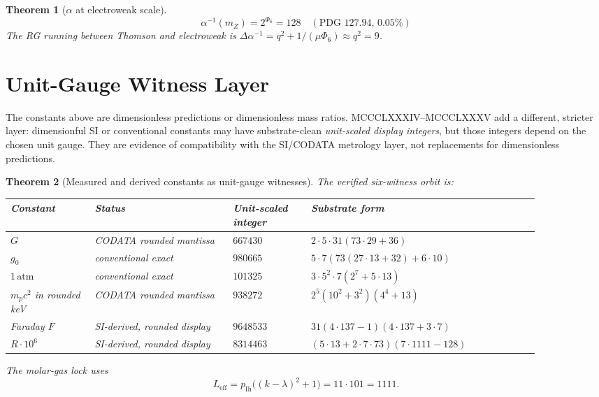 \documentclass[11pt]{article}
\newtheorem{theorem}{Theorem}
\begin{document}
\begin{theorem}[$\alpha$ at electroweak scale]\label{thm:alpha_mZ}
\[
  \alpha^{-1}(m_Z) = 2^{\Phi_6} = 128 \quad (\text{PDG 127.94, 0.05\%})
\]
The RG running between Thomson and electroweak is
$\Delta\alpha^{-1} = q^2 + 1/(\mu\Phi_6) \approx q^2 = 9$.
\end{theorem}

\section{Unit-Gauge Witness Layer}\label{sec:unit_gauge_witness_layer}

The constants above are dimensionless predictions or dimensionless mass
ratios.  MCCCLXXXIV--MCCCLXXXV add a different, stricter layer:
dimensionful SI or conventional constants may have substrate-clean
\emph{unit-scaled display integers}, but those integers depend on the
chosen unit gauge.  They are evidence of compatibility with the SI/CODATA
metrology layer, not replacements for dimensionless predictions.

\begin{theorem}[Measured and derived constants as unit-gauge witnesses]\label{thm:unit_gauge_witnesses}
The verified six-witness orbit is:
\begin{center}\scriptsize
\renewcommand{\arraystretch}{1.2}
\setlength{\tabcolsep}{3pt}
\begin{tabular}{>{\raggedright\arraybackslash}p{0.14\linewidth}
                >{\raggedright\arraybackslash}p{0.23\linewidth}
                >{\raggedright\arraybackslash}p{0.13\linewidth}
                >{\raggedright\arraybackslash}p{0.38\linewidth}}
\toprule
Constant & Status & Unit-scaled integer & Substrate form \\
\midrule
$G$ & CODATA rounded mantissa & $667430$ &
$2\cdot5\cdot31(73\cdot29+36)$ \\
$g_0$ & conventional exact & $980665$ &
$5\cdot7(73(27\cdot13+32)+6\cdot10)$ \\
$1\,\mathrm{atm}$ & conventional exact & $101325$ &
$3\cdot5^2\cdot7(2^7+5\cdot13)$ \\
$m_pc^2$ in rounded keV & CODATA rounded mantissa & $938272$ &
$2^5(10^2+3^2)(4^4+13)$ \\
Faraday $F$ & SI-derived, rounded display & $9648533$ &
$31(4\cdot137-1)(4\cdot137+3\cdot7)$ \\
$R\cdot10^6$ & SI-derived, rounded display & $8314463$ &
$(5\cdot13+2\cdot7\cdot73)(7\cdot1111-128)$ \\
\bottomrule
\end{tabular}
\end{center}
The molar-gas lock uses
\[
  L_{\mathrm{eff}}=p_{\mathrm{Ih}}\big((k-\lambda)^2+1\big)=11\cdot101=1111.
\]
\end{theorem}
\end{document}
